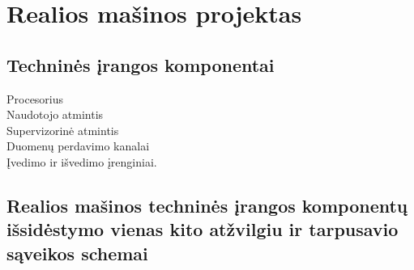 \section{Realios mašinos projektas}

\subsection{Techninės įrangos komponentai}

\begin{description}
  \item[Procesorius] 
  \item[Naudotojo atmintis]
  \item[Supervizorinė atmintis]
  \item[Duomenų perdavimo kanalai] 
  \item[Įvedimo ir išvedimo įrenginiai.] 
\end{description}

\subsection{Realios mašinos techninės įrangos komponentų išsidėstymo vienas kito atžvilgiu ir tarpusavio sąveikos schemai}
